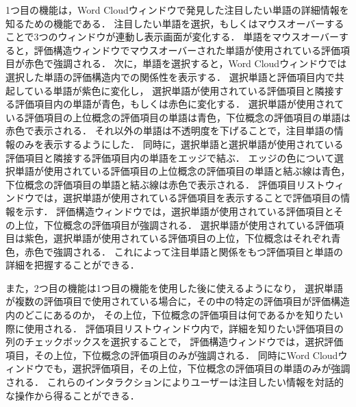 \documentclass[syuuron]{kuee}
\begin{document}
			1つ目の機能は，Word Cloudウィンドウで発見した注目したい単語の詳細情報を知るための機能である．
			注目したい単語を選択，もしくはマウスオーバーすることで3つのウィンドウが連動し表示画面が変化する．
			単語をマウスオーバーすると，評価構造ウィンドウでマウスオーバーされた単語が使用されている評価項目が赤色で強調される．
			次に，単語を選択すると，Word Cloudウィンドウでは選択した単語の評価構造内での関係性を表示する．
			選択単語と評価項目内で共起している単語が紫色に変化し，
			選択単語が使用されている評価項目と隣接する評価項目内の単語が青色，もしくは赤色に変化する．
			選択単語が使用されている評価項目の上位概念の評価項目の単語は青色，下位概念の評価項目の単語は赤色で表示される．
			それ以外の単語は不透明度を下げることで，注目単語の情報のみを表示するようにした．
			同時に，選択単語と選択単語が使用されている評価項目と隣接する評価項目内の単語をエッジで結ぶ．
			エッジの色について選択単語が使用されている評価項目の上位概念の評価項目の単語と結ぶ線は青色，
			下位概念の評価項目の単語と結ぶ線は赤色で表示される．
			評価項目リストウィンドウでは，選択単語が使用されている評価項目を表示することで評価項目の情報を示す．
			評価構造ウィンドウでは，選択単語が使用されている評価項目とその上位，下位概念の評価項目が強調される．
			選択単語が使用されている評価項目は紫色，選択単語が使用されている評価項目の上位，下位概念はそれぞれ青色，赤色で強調される．
			これによって注目単語と関係をもつ評価項目と単語の詳細を把握することができる．
			
			また，2つ目の機能は1つ目の機能を使用した後に使えるようになり，
			選択単語が複数の評価項目で使用されている場合に，その中の特定の評価項目が評価構造内のどこにあるのか，
			その上位，下位概念の評価項目は何であるかを知りたい際に使用される．
			評価項目リストウィンドウ内で，詳細を知りたい評価項目の列のチェックボックスを選択することで，
			評価構造ウィンドウでは，選択評価項目，その上位，下位概念の評価項目のみが強調される．
			同時にWord Cloudウィンドウでも，選択評価項目，その上位，下位概念の評価項目の単語のみが強調される．
			これらのインタラクションによりユーザーは注目したい情報を対話的な操作から得ることができる．
			
\end{document}
